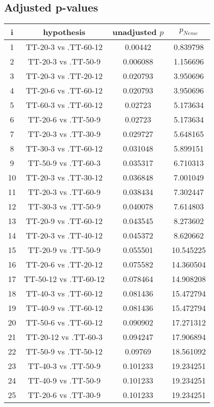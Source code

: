 \documentclass[a4paper,10pt]{article}
\begin{document}
\begin{landscape}
\pagebreak

\subsection{Adjusted p-values}

\begin{table}[!htp]
\centering\scriptsize
\begin{tabular}{cccc}
i&hypothesis&unadjusted $p$&$p_{Neme}$\\
\hline1&TT-20-3 vs .TT-60-12&0.00442&0.839798\\
2&TT-20-3 vs .TT-50-9&0.006088&1.156696\\
3&TT-20-3 vs .TT-20-12&0.020793&3.950696\\
4&TT-20-6 vs .TT-60-12&0.020793&3.950696\\
5&TT-60-3 vs .TT-60-12&0.02723&5.173634\\
6&TT-20-6 vs .TT-50-9&0.02723&5.173634\\
7&TT-20-3 vs .TT-30-9&0.029727&5.648165\\
8&TT-30-3 vs .TT-60-12&0.031048&5.899151\\
9&TT-50-9 vs .TT-60-3&0.035317&6.710313\\
10&TT-20-3 vs .TT-30-12&0.036848&7.001049\\
11&TT-20-3 vs .TT-60-9&0.038434&7.302447\\
12&TT-30-3 vs .TT-50-9&0.040078&7.614803\\
13&TT-20-9 vs .TT-60-12&0.043545&8.273602\\
14&TT-20-3 vs .TT-40-12&0.045372&8.620662\\
15&TT-20-9 vs .TT-50-9&0.055501&10.545225\\
16&TT-20-6 vs .TT-20-12&0.075582&14.360504\\
17&TT-50-12 vs .TT-60-12&0.078464&14.908208\\
18&TT-40-3 vs .TT-60-12&0.081436&15.472794\\
19&TT-40-9 vs .TT-60-12&0.081436&15.472794\\
20&TT-50-6 vs .TT-60-12&0.090902&17.271312\\
21&TT-20-12 vs .TT-60-3&0.094247&17.906894\\
22&TT-50-9 vs .TT-50-12&0.09769&18.561092\\
23&TT-40-3 vs .TT-50-9&0.101233&19.234251\\
24&TT-40-9 vs .TT-50-9&0.101233&19.234251\\
25&TT-20-6 vs .TT-30-9&0.101233&19.234251\\

\end{tabular}
\end{table}
\end{landscape}
\end{document}
